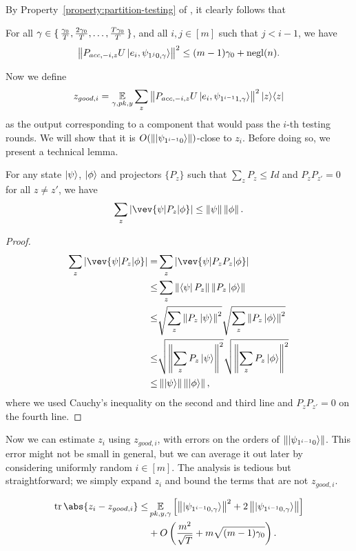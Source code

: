 By Property~\ref{property:partition-testing} of ,
it clearly follows that 
\begin{cor}
	\label{lem:partition-testing}
	For all $\gamma\in\set{\frac{\gamma_0}{T},\frac{2\gamma_0}{T},\dots,\frac{T\gamma_0}{T}}$, and all $i,j\in[m]$ such that $j<i-1$, we have
	$$\left\lVert P_{acc,-i,z} U \ket{e_i, \psi_{1^j0,\gamma}}\right\rVert^2\leq (m-1)\gamma_0+\operatorname{negl}(n).$$
\end{cor}

Now we define
\begin{equation}
	\label{eq:zgoodi-def}
	z_{good, i}=\operatorname*{\mathbb{E}}_{\gamma, pk, y} \sum_z \left\lVert P_{acc,-i,z} U\ket{e_i,\psi_{1^{i-1}1,\gamma}}\right\rVert^2|z\rangle\langle z|
\end{equation}
as the output corresponding to a component that would pass the $i$-th testing rounds.
We will show that it is $O(\left\lVert\ket{\psi_{1^{i-1}0}}\right\rVert)$-close to $z_i$.
Before doing so, we present a technical lemma.
\begin{lemma}\label{lem:samp-tech}
	For any state $\ket{\psi}$,  $\ket{\phi}$ and projectors $\{P_z\}$ such that $\sum_z P_z \leq Id$ and $P_z P_{z'} =0 $ for all $z\neq z'$, we have
	$$  \sum_z |\vev{\psi|P_z|\phi}| \leq \norm{\psi}\norm{\phi}. $$
\end{lemma}
\begin{proof}
	\begin{align}
		\sum_z |\vev{\psi|P_z|\phi}| =&\sum_z|\vev{\psi|P_zP_z|\phi}| \nn \\
		\leq& \sum_z \norm{\bra{\psi}P_z} \norm{ P_z\ket{\phi}} \nn \\
		\leq&  \sqrt{\sum_z \norm{P_z\ket{\psi}}^2} \sqrt{\sum_z\norm{P_z\ket{\phi}}^2} \nn \\
		\leq& \sqrt{\norm{\sum_z P_z\ket{\psi}}^2 } \sqrt{\norm{\sum_z P_z\ket{\phi}}^2 } \nn \\
		\leq & \norm{\ket{\psi}}\norm{\ket{\phi}},
	\end{align}
	where we used Cauchy's inequality on the second and third line and $P_z P_{z'} =0 $ on the fourth line.
\end{proof}

Now we can estimate $z_i$ using $z_{good, i}$, with errors on the orders of $\left\lVert\ket{\psi_{1^{i-1}0}}\right\rVert$.
This error might not be small in general,
but we can average it out later by considering uniformly random $i\in[m]$.
The analysis is tedious but straightforward;
we simply expand $z_i$ and bound the terms that are not $z_{good, i}$.

\begin{lemma}
	\label{thm:zi-zgoodi}
	\begin{align*}
	\tr\abs{z_i-z_{good, i}}\leq&\E_{pk, y, \gamma}\L[\norm{\ket{\psi_{1^{i-1}0,\gamma}}}^2+2\norm{\ket{\psi_{1^{i-1}0,\gamma}}}\R]\\
	&+O\L(\frac{m^2}{\sqrt T}+m\sqrt{(m-1)\gamma_0}\R).
	\end{align*}
\end{lemma}

